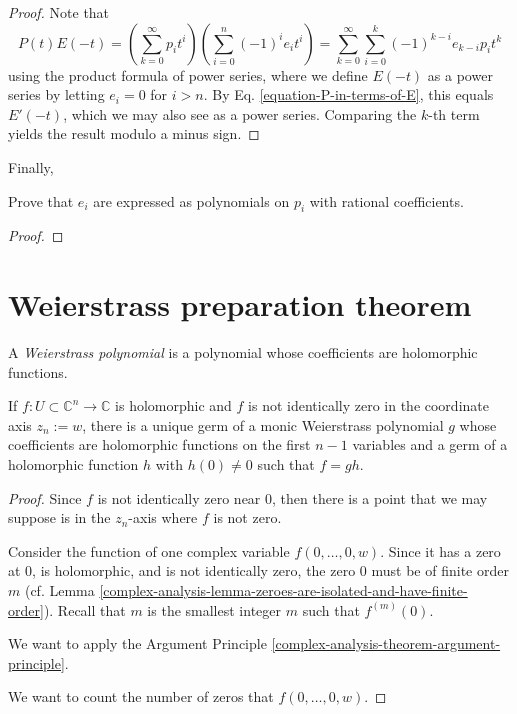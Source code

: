 \begin{proof}
Note that
$$
P(t)E(-t)=\left(\sum_{k=0}^{\infty} p_it^i\right)
\left(\sum_{i=0}^n(-1)^ie_it^i\right)
=\sum_{k=0}^\infty \sum_{i=0}^k (-1)^{k-i}e_{k-i}p_it^k
$$
using the product formula of power series, where we define $E(-t)$ as a power
series by letting $e_i=0$ for $i>n$. By Eq. \ref{equation-P-in-terms-of-E}, this
equals $E'(-t)$, which we may also see as a power series. Comparing the $k$-th
term yields the result modulo a minus sign.
\end{proof}

Finally,

\begin{exercise}
\label{exercise-symmetric-polynomials-in-terms-of-Newton-polynomials}
Prove that $e_i$ are expressed as polynomials on $p_i$ with rational
coefficients.
\end{exercise}

\begin{proof}

\end{proof}

\section{Weierstrass preparation theorem}
\label{section-Weierstrass-preparation-theorem}

\begin{definition}
\label{definition-Weierstrass-polynomial}
A {\it Weierstrass polynomial} is a polynomial whose coefficients are
holomorphic functions.
\end{definition}

\begin{theorem}
\label{theorem-Weierstrass-preparation}
If $f:U\subset\mathbb{C}^n\to\mathbb{C}$ is holomorphic and $f$ is not
identically zero in the coordinate axis $z_n:=w$, there
is a unique germ of a monic Weierstrass polynomial $g$ whose coefficients are
holomorphic functions on the first $n-1$ variables 
and a germ of a holomorphic 
function $h$ with $h(0)\neq 0$ such that $f=gh$.
\end{theorem}

\begin{proof}

Since $f$ is not identically zero near $0$, then there is a point that we may
suppose is in the $z_n$-axis where $f$ is not zero.

Consider the function of one complex variable $f(0,\ldots,0,w)$. Since it has a
zero at $0$, is holomorphic, and is not identically zero, the zero $0$ must be
of finite order $m$ (cf. Lemma
\ref{complex-analysis-lemma-zeroes-are-isolated-and-have-finite-order}). Recall
that $m$ is the smallest integer $m$ such that $f^{(m)}(0)$.

We want to apply the Argument Principle
\ref{complex-analysis-theorem-argument-principle}.

We want to count the number of zeros that $f(0,…,0,w)$.

\end{proof}

